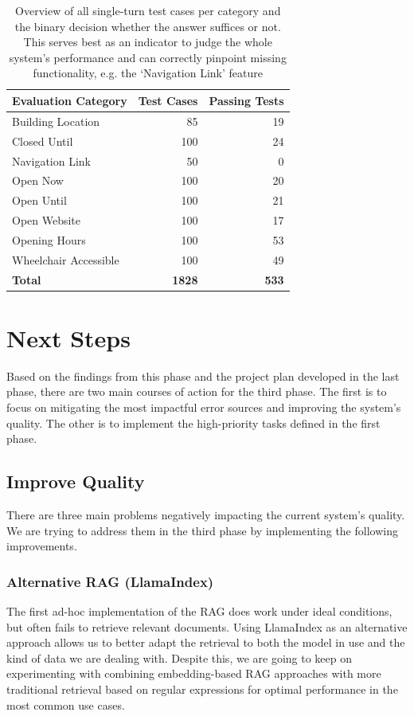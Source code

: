 \documentclass{article}
\begin{document}
\begin{table}[!htb]
\centering
\caption{Overview of all single-turn test cases per category and the binary decision whether the answer suffices or not. This serves best as an indicator to judge the whole system's performance and can correctly pinpoint missing functionality, e.g. the `Navigation Link' feature}
\vspace{0.5cm}
\begin{tabular}{lrr}
\toprule
\textbf{Evaluation Category} & \textbf{Test Cases} & \textbf{Passing Tests} \\
\midrule
Building Location & 85 & 19 \\
Closed Until & 100 & 24 \\
Navigation Link & 50 & 0 \\
Open Now & 100 & 20 \\
Open Until & 100 & 21 \\
Open Website & 100 & 17 \\
Opening Hours & 100 & 53 \\
Wheelchair Accessible & 100 & 49 \\
\midrule
\textbf{Total} & \textbf{1828} & \textbf{533} \\
\bottomrule
\end{tabular}
\label{tab:results}

\end{table}

\newpage

\section{Next Steps} \label{sec:next_steps}
Based on the findings from this phase and the project plan developed in the last phase, there are two main courses of action for the third phase. The first is to focus on mitigating the most impactful error sources and improving the system's quality. The other is to implement the high-priority tasks defined in the first phase.

\subsection{Improve Quality} \label{sec:impr_qual}
There are three main problems negatively impacting the current system's quality. We are trying to address them in the third phase by implementing the following improvements.

\subsubsection{Alternative RAG (LlamaIndex)} \label{sec:alt_RAG}
The first ad-hoc implementation of the RAG does work under ideal conditions, but often fails to retrieve relevant documents. Using LlamaIndex as an alternative approach allows us to better adapt the retrieval to both the model in use and the kind of data we are dealing with. Despite this, we are going to keep on experimenting with combining embedding-based RAG approaches with more traditional retrieval based on regular expressions for optimal performance in the most common use cases.
\end{document}
